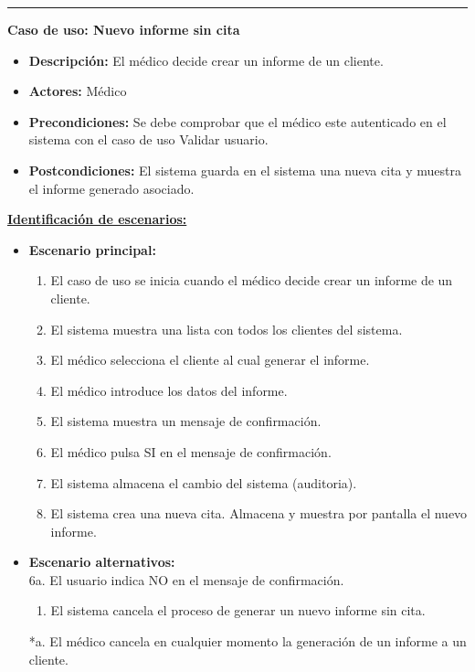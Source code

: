 \smallskip
\hrule height 1pt
\smallskip
\textbf{Caso de uso: Nuevo informe sin cita}
\begin{itemize}\renewcommand{\labelitemi}{$\cdot$}
 \item \textbf{Descripción:} El médico decide crear un informe de un cliente.
  \item \textbf{Actores:} Médico
  \item \textbf{Precondiciones:} Se debe comprobar que el médico este autenticado en el sistema con el caso de uso Validar usuario.
  \item \textbf{Postcondiciones:} El sistema guarda en el sistema una nueva cita y muestra el informe generado asociado.
\end{itemize}
\underline{\textbf{Identificación de escenarios:}}
\begin{itemize}\renewcommand{\labelitemi}{$\circ$}
 \item \textbf{Escenario principal:}
         \begin{enumerate}
          \item El caso de uso se inicia cuando el médico decide crear un informe de un cliente.
	  \item El sistema muestra una lista con todos los clientes del sistema.
          \item El médico selecciona el cliente al cual generar el informe.
          \item El médico introduce los datos del informe.
	  \item El sistema muestra un mensaje de confirmación.
          \item El médico pulsa SI en el mensaje de confirmación.
 	  \item El sistema almacena el cambio del sistema (auditoria).
	  \item El sistema crea una nueva cita. Almacena y muestra por pantalla el nuevo informe.
         \end{enumerate}
\item \textbf{Escenario alternativos:}\\
  			6a. El usuario indica NO en el mensaje de confirmación.
  			\begin{enumerate}
  			\item El sistema cancela el proceso de generar un nuevo informe sin cita.
  			\end{enumerate}
          *a. El médico cancela en cualquier momento la generación de un informe a un cliente.
\end{itemize}


